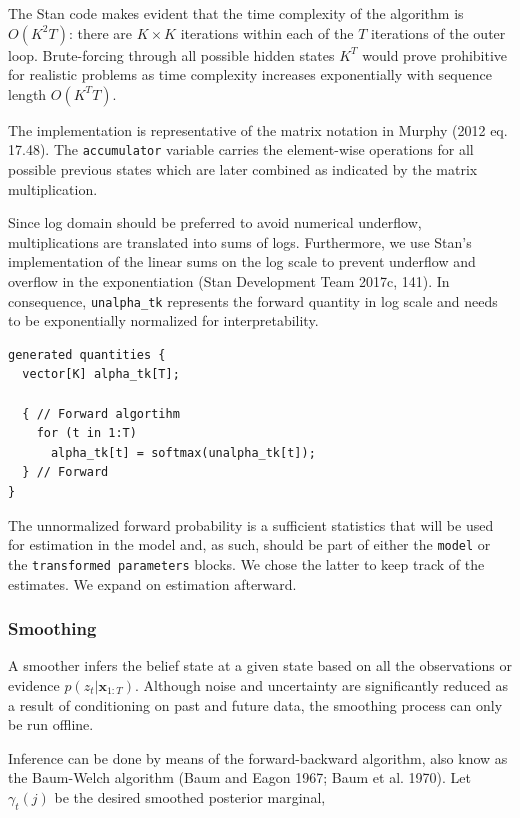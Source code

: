 \documentclass[]{article}
\newcommand{\mat}[1]{\mathbf{#1}}
\begin{document}
The Stan code makes evident that the time complexity of the algorithm is
\(O(K^2T)\): there are \(K \times K\) iterations within each of the
\(T\) iterations of the outer loop. Brute-forcing through all possible
hidden states \(K^T\) would prove prohibitive for realistic problems as
time complexity increases exponentially with sequence length
\(O(K^TT)\).

The implementation is representative of the matrix notation in Murphy
(2012 eq. 17.48). The \texttt{accumulator} variable carries the
element-wise operations for all possible previous states which are later
combined as indicated by the matrix multiplication.

Since log domain should be preferred to avoid numerical underflow,
multiplications are translated into sums of logs. Furthermore, we use
Stan's implementation of the linear sums on the log scale to prevent
underflow and overflow in the exponentiation (Stan Development Team
2017c, 141). In consequence, \texttt{unalpha\_tk} represents the forward
quantity in log scale and needs to be exponentially normalized for
interpretability.

\begin{verbatim}
generated quantities {
  vector[K] alpha_tk[T];

  { // Forward algortihm
    for (t in 1:T)
      alpha_tk[t] = softmax(unalpha_tk[t]);
  } // Forward
}
\end{verbatim}

The unnormalized forward probability is a sufficient statistics that
will be used for estimation in the model and, as such, should be part of
either the \texttt{model} or the \texttt{transformed\ parameters}
blocks. We chose the latter to keep track of the estimates. We expand on
estimation afterward.

\subsubsection{Smoothing}\label{smoothing}

A smoother infers the belief state at a given state based on all the
observations or evidence \(p(z_t | \mat{x}_{1:T})\). Although noise and
uncertainty are significantly reduced as a result of conditioning on
past and future data, the smoothing process can only be run offline.

Inference can be done by means of the forward-backward algorithm, also
know as the Baum-Welch algorithm (Baum and Eagon 1967; Baum et al.
1970). Let \(\gamma_t(j)\) be the desired smoothed posterior marginal,
\end{document}
